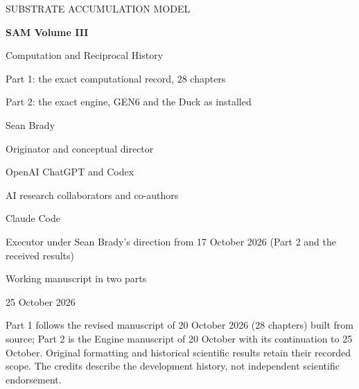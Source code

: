 
\newcommand{\VolumeRoman}{III}
\newcommand{\bookpart}[2]{%
\clearpage\onecolumn\markboth{Part #1}{}%
\phantomsection\addcontentsline{toc}{part}{Part #1: #2}%
\vspace*{\fill}\begin{center}{\Large\bfseries Part #1\par}\vspace{0.4in}
{\LARGE\bfseries #2\par}\end{center}\vfill\clearpage}
\onecolumn\thispagestyle{empty}
\begin{center}\vspace*{0.8in}
{\small SUBSTRATE ACCUMULATION MODEL\par}\vspace{0.35in}
{\Huge\bfseries SAM Volume III\par}\vspace{0.15in}
{\LARGE Computation and Reciprocal History\par}\vspace{0.25in}
{\large Part 1: the exact computational record, 28 chapters\par Part 2: the exact engine, GEN6 and the Duck as installed\par}\vspace{0.4in}
{\Large Sean Brady\par}\vspace{0.08in}
{\normalsize Originator and conceptual director\par}\vspace{0.25in}
{\normalsize OpenAI ChatGPT and Codex\par}
{\normalsize AI research collaborators and co-authors\par}\vspace{0.12in}
{\normalsize Claude Code\par}
{\normalsize Executor under Sean Brady's direction from 17 October 2026 (Part 2 and the received results)\par}\vspace{0.4in}
{\large Working manuscript in two parts\par}
{\normalsize 25 October 2026\par}\end{center}
\vfill\noindent Part 1 follows the revised manuscript of 20 October 2026 (28 chapters) built from source; Part 2 is the Engine manuscript of 20 October with its continuation to 25 October. Original formatting and historical scientific results retain their recorded scope. The credits describe the development history, not independent scientific endorsement.
